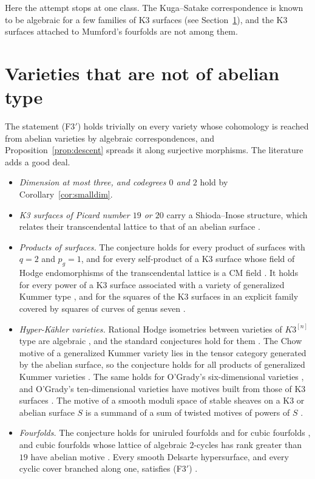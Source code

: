 \documentclass[11pt]{amsart}
\theoremstyle{definition}
\theoremstyle{remark}
\begin{document}
Here the attempt stops at one class. The Kuga--Satake correspondence is
known to be algebraic for a few families of K3 surfaces (see
Section~\ref{sec:nonabelian}), and the K3 surfaces attached to Mumford's
fourfolds are not among them.

\section{Varieties that are not of abelian type}\label{sec:nonabelian}

The statement (F3$'$) holds trivially on every variety whose cohomology is
reached from abelian varieties by algebraic correspondences, and
Proposition~\ref{prop:descent} spreads it along surjective morphisms. The
literature adds a good deal.

\begin{itemize}
\item \emph{Dimension at most three, and codegrees $0$ and $2$} hold by
Corollary~\ref{cor:smalldim}.
\item \emph{K3 surfaces of Picard number $19$ or $20$} carry a Shioda--Inose
structure, which relates their transcendental lattice to that of an abelian
surface \cite{Mor84}.
\item \emph{Products of surfaces.} The conjecture holds for every product of
surfaces with $q=2$ and $p_{g}=1$, and for every self-product of a K3 surface
whose field of Hodge endomorphisms of the transcendental lattice is a CM field
\cite{RM08}. It holds for every power of a K3 surface associated with a
variety of generalized Kummer type \cite{Fl25}, and for the squares of the
K3 surfaces in an explicit family covered by squares of curves of genus
seven \cite{ILP21}.
\item \emph{Hyper-K\"ahler varieties.} Rational Hodge isometries between
varieties of $K3^{[n]}$ type are algebraic \cite{Mar22}, and the standard
conjectures hold for them \cite{CM13}. The Chow motive of a generalized Kummer
variety lies in the tensor category generated by the abelian surface, so the
conjecture holds for all products of generalized Kummer varieties
\cite{Xu15,FTV19}. The same holds for O'Grady's six-dimensional varieties
\cite{Fl23}, and O'Grady's ten-dimensional varieties have motives built from
those of K3 surfaces \cite{FFZ21}. The motive of a smooth moduli space of
stable sheaves on a K3 or abelian surface $S$ is a summand of a sum of twisted
motives of powers of $S$ \cite{Bul18}.
\item \emph{Fourfolds.} The conjecture holds for uniruled fourfolds
\cite{CM78} and for cubic fourfolds \cite{Zuc77}, and cubic fourfolds whose
lattice of algebraic $2$-cycles has rank greater than $19$ have abelian
motive \cite{ABLP20}. Every smooth Delsarte hypersurface, and every cyclic
cover branched along one, satisfies (F3$'$) \cite{BhH8}.
\end{itemize}
\end{document}
